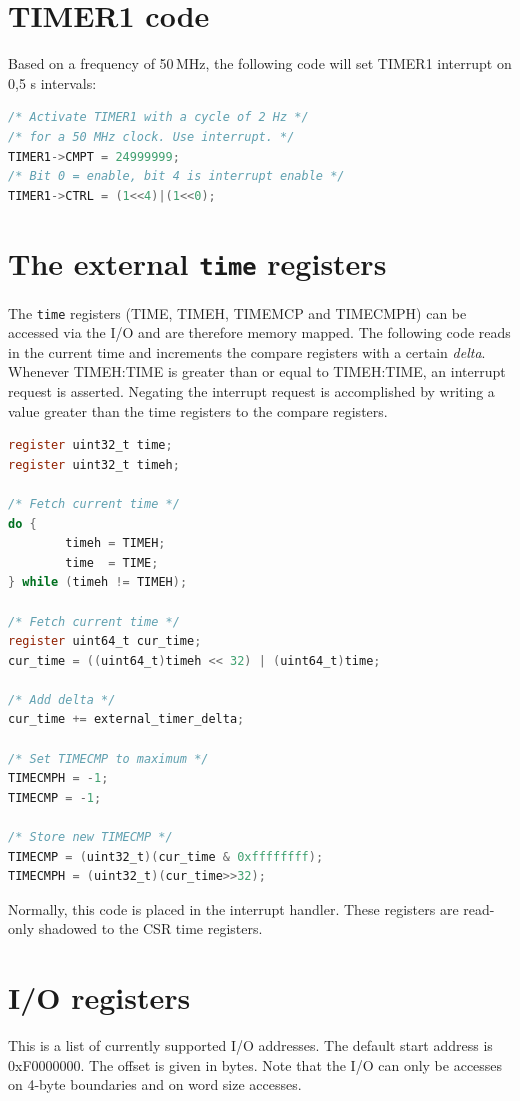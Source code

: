 \documentclass[12pt]{article}
\begin{document}
\section{TIMER1 code}
Based on a frequency of 50$\,$MHz, the following code will set TIMER1 interrupt on 0,5 s intervals:

\begin{lstlisting}[language=C]
/* Activate TIMER1 with a cycle of 2 Hz */
/* for a 50 MHz clock. Use interrupt. */
TIMER1->CMPT = 24999999;
/* Bit 0 = enable, bit 4 is interrupt enable */
TIMER1->CTRL = (1<<4)|(1<<0);
\end{lstlisting}

\section{The external \texttt{time} registers}
The \texttt{time} registers (TIME, TIMEH, TIMEMCP and TIMECMPH) can be accessed via the I/O and are therefore memory mapped. The following code reads in the current time and increments the compare registers with a certain \emph{delta}. Whenever TIMEH:TIME is greater than or equal to TIMEH:TIME, an interrupt request is asserted. Negating the interrupt request is accomplished by writing a value greater than the time registers to the compare registers.

\begin{lstlisting}[language=C]
register uint32_t time;
register uint32_t timeh;

/* Fetch current time */
do {
        timeh = TIMEH;
        time  = TIME;
} while (timeh != TIMEH);

/* Fetch current time */
register uint64_t cur_time;
cur_time = ((uint64_t)timeh << 32) | (uint64_t)time;

/* Add delta */
cur_time += external_timer_delta;

/* Set TIMECMP to maximum */
TIMECMPH = -1;
TIMECMP = -1;

/* Store new TIMECMP */
TIMECMP = (uint32_t)(cur_time & 0xffffffff);
TIMECMPH = (uint32_t)(cur_time>>32);
\end{lstlisting}

Normally, this code is placed in the interrupt handler. These registers are read-only shadowed to the CSR time registers.

\section{I/O registers}
\label{sec:ioregisters}
This is a list of currently supported I/O addresses. 
The default start address is 0xF0000000. The offset is given in bytes. Note that the I/O can only be accesses on 4-byte boundaries and on word size accesses.
\end{document}
